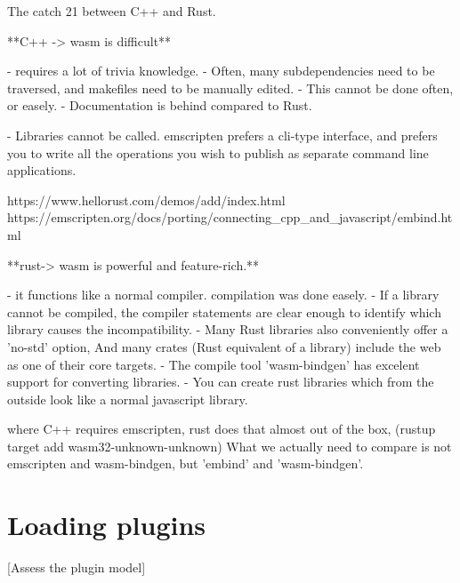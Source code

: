 The catch 21 between C++ and Rust.

\begin{note}

  **C++ -> wasm is difficult**
  
  - requires a lot of trivia knowledge. 
    - Often, many subdependencies need to be traversed, and makefiles need to be manually edited. 
    - This cannot be done often, or easely. 
  - Documentation is behind compared to Rust.

  - Libraries cannot be called. emscripten prefers a cli-type interface, and prefers you to write all the operations you wish to publish as separate command line applications. 

  https://www.hellorust.com/demos/add/index.html
  https://emscripten.org/docs/porting/connecting_cpp_and_javascript/embind.html


  **rust-> wasm is powerful and feature-rich.** 
  
  - it functions like a normal compiler. compilation was done easely. 
  - If a library cannot be compiled, the compiler statements are clear enough to identify which library causes the incompatibility. 
  - Many Rust libraries also conveniently offer a 'no-std' option, 
    And many crates (Rust equivalent of a library) include the web as one of their core targets. 
  - The compile tool 'wasm-bindgen' has excelent support for converting libraries. 
    - You can create rust libraries which from the outside look like a normal javascript library. 

\end{note}

\begin{note}
  where C++ requires emscripten, rust does that almost out of the box, (rustup target add wasm32-unknown-unknown)
  What we actually need to compare is not emscripten and wasm-bindgen, but 'embind' and 'wasm-bindgen'. 
\end{note}

\section{Loading plugins}
\label{sec:analyses:loading}

[Assess the plugin model]



